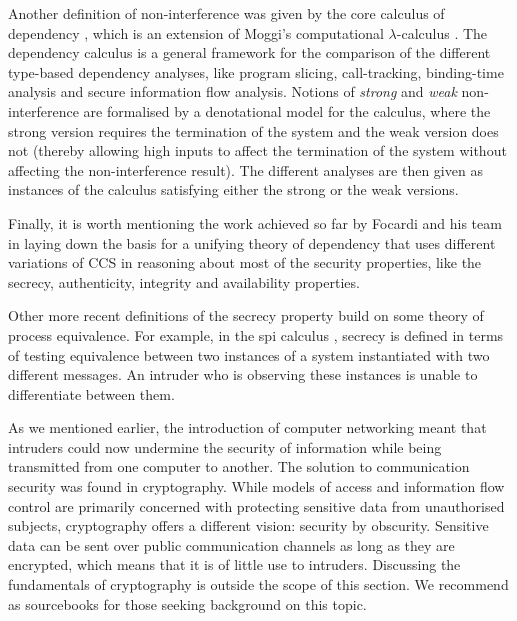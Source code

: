 \documentclass[10pt,a4paper,final,oneside,fleqn]{book}
\begin{document}
Another definition of non-interference was given by the core calculus of dependency \cite{abadi6}, which is an extension of Moggi's computational $\lambda$-calculus \cite{moggi1}.  The dependency calculus is a general framework for the comparison of the different type-based dependency analyses, like program slicing, call-tracking, binding-time analysis and secure information flow analysis.  Notions of {\itshape strong\/} and {\itshape weak\/} non-interference are formalised by a denotational model for the calculus, where the strong version requires the termination of the system and the weak version does not (thereby allowing high inputs to affect the termination of the system without affecting the non-interference result).  The different analyses are then given as instances of the calculus satisfying either the strong or the weak versions.

Finally, it is worth mentioning the work achieved so far by Focardi and his team \cite{focardi1,focardi2,focardi3,focardi4,focardi5,focardi6,focardi7,focardi8} in laying down the basis for a unifying theory of dependency that uses different variations of CCS in reasoning about most of the security properties, like the secrecy, authenticity, integrity and availability properties.

Other more recent definitions of the secrecy property build on some theory of process equivalence.  For example, in the spi calculus \cite{abadi1}, secrecy is defined in terms of testing equivalence between two instances of a system instantiated with two different messages.  An intruder who is observing these instances is unable to differentiate between them.

As we mentioned earlier, the introduction of computer networking meant that intruders could now undermine the security of information while being transmitted from one computer to another.  The solution to communication security was found in cryptography.  While models of access and information flow control are primarily concerned with protecting sensitive data from unauthorised subjects, cryptography offers a different vision: security by obscurity.  Sensitive data can be sent over public communication channels as long as they are encrypted, which means that it is of little use to intruders.  Discussing the fundamentals of cryptography is outside the scope of this section. We recommend \cite{menezes1,schneier1} as sourcebooks for those seeking background on this topic.
\end{document}
